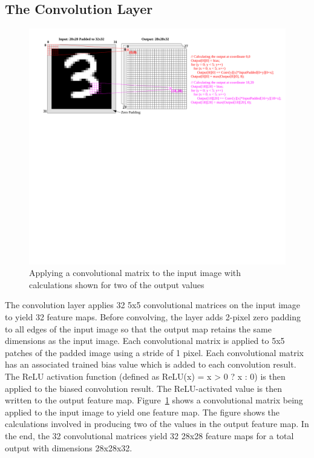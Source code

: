 \documentclass[epsfig,10pt,fullpage]{article}
\begin{document}
\subsection*{The Convolution Layer}

\begin{figure}[H]
   \begin{center}
       \hspace*{0.1cm}\includegraphics[scale=0.6]{figures/fig_cnn_layer}
   \end{center}
   \caption{Applying a convolutional matrix to the input image with calculations shown for two of the output values}
	\label{fig:cnn_layer}
\end{figure}

The convolution layer applies 32 5x5 convolutional matrices on the input image to yield 32 feature maps. 
Before convolving, the layer adds 2-pixel zero padding to all edges of the input image so that the output map retains the same dimensions as the input image.
Each convolutional matrix is applied to 5x5 patches of the padded image using a stride of 1 pixel.
Each convolutional matrix has an associated trained bias value which is added to each convolution result.
The ReLU activation function (defined as ReLU(x) = x > 0 ? x : 0) is then applied to the biased convolution result.
The ReLU-activated value is then written to the output feature map.
Figure~\ref{fig:cnn_layer} shows a convolutional matrix being applied to the input image to yield one feature map.
The figure shows the calculations involved in producing two of the values in the output feature map.
In the end, the 32 convolutional matrices yield 32 28x28 feature maps for a total output with dimensions 28x28x32. 
\end{document}
